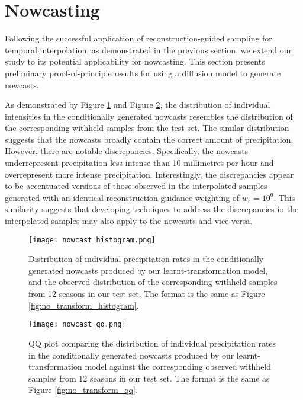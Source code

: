 \documentclass[ oneside,%
                    author={George Herbert},
                    degree={MSci},
                     title={Diffusion Models for Time-Evolving Precipitation Fields},
                  subtitle={}]{dissertation}
\begin{document}
\section{Nowcasting}
\label{sec:results_nowcasting}

Following the successful application of reconstruction-guided sampling for temporal interpolation, as demonstrated in the previous section, we extend our study to its potential applicability for nowcasting. This section presents preliminary proof-of-principle results for using a diffusion model to generate nowcasts.

As demonstrated by Figure \ref{fig:nowcast_histogram} and Figure \ref{fig:nowcast_qq}, the distribution of individual intensities in the conditionally generated nowcasts resembles the distribution of the corresponding withheld samples from the test set. The similar distribution suggests that the nowcasts broadly contain the correct amount of precipitation. However, there are notable discrepancies. Specifically, the nowcasts underrepresent precipitation less intense than 10 millimetres per hour and overrepresent more intense precipitation. Interestingly, the discrepancies appear to be accentuated versions of those observed in the interpolated samples generated with an identical reconstruction-guidance weighting of $w_r=10^6$. This similarity suggests that developing techniques to address the discrepancies in the interpolated samples may also apply to the nowcasts and vice versa.

\begin{figure}[htbp]
      \centering
      \texttt{[image: nowcast\_histogram.png]}
      \caption{Distribution of individual precipitation rates in the conditionally generated nowcasts produced by our learnt-transformation model, and the observed distribution of the corresponding withheld samples from 12 seasons in our test set. The format is the same as Figure \ref{fig:no_transform_histogram}.}
      \label{fig:nowcast_histogram}
\end{figure}

\begin{figure}[htbp]
      \centering
      \texttt{[image: nowcast\_qq.png]}
      \caption{QQ plot comparing the distribution of individual precipitation rates in the conditionally generated nowcasts produced by our learnt-transformation model against the corresponding observed withheld samples from 12 seasons in our test set. The format is the same as Figure \ref{fig:no_transform_qq}.}
      \label{fig:nowcast_qq}
\end{figure}
\end{document}

